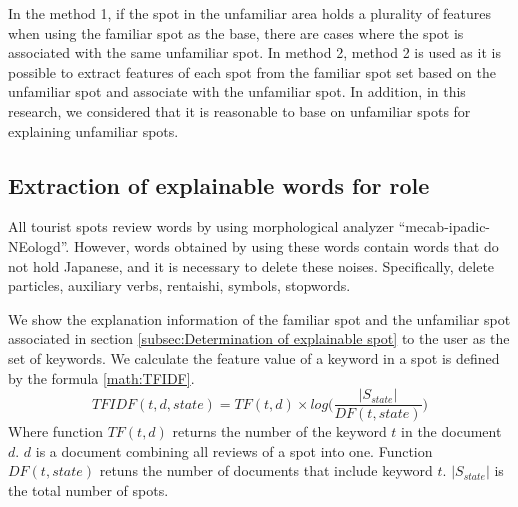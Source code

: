 \documentclass[journal]{IAENGtran}
\begin{document}
In the method 1, if the spot in the unfamiliar area holds a plurality of features when using the familiar spot as the base, there are cases where the spot is associated with the same unfamiliar spot.
In method 2, method 2 is used as it is possible to extract features of each spot from the familiar spot set based on the unfamiliar spot and associate with the unfamiliar spot.
In addition, in this research, we considered that it is reasonable to base on unfamiliar spots for explaining unfamiliar spots.

\subsection{Extraction of explainable words for role}
\label{subsec:Extraction of explainable words for role}
All tourist spots review words by using morphological analyzer ``mecab-ipadic-NEologd''.
However, words obtained by using these words contain words that do not hold Japanese, and it is necessary to delete these noises.
Specifically, delete particles, auxiliary verbs, rentaishi, symbols, stopwords.

We show the explanation information of the familiar spot and the unfamiliar spot associated in section \ref{subsec:Determination of explainable spot} to the user as the set of keywords.
We calculate the feature value of a keyword in a spot is defined by the formula \ref{math:TFIDF}.
\begin{equation}
  TFIDF(t,d,state) = TF(t,d) \times log\Biggr(\frac{|S_{state}|}{DF(t,state)}\Biggr)
  \label{math:TFIDF}
\end{equation}
Where function $TF(t,d)$ returns the number of the keyword $t$ in the document $d$.
$d$ is a document combining all reviews of a spot into one.
Function $DF(t,state)$ retuns the number of documents that include keyword $t$.
$|S_{state}|$ is the total number of spots.
\end{document}
